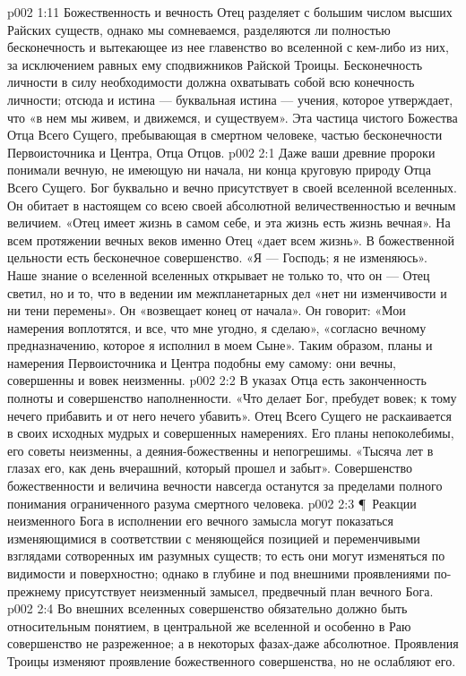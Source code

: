 \vs p002 1:11 Божественность и вечность Отец разделяет с большим числом высших Райских существ, однако мы сомневаемся, разделяются ли полностью бесконечность и вытекающее из нее главенство во вселенной с кем\hyp{}либо из них, за исключением равных ему сподвижников Райской Троицы. Бесконечность личности в силу необходимости должна охватывать собой всю конечность личности; отсюда и истина --- буквальная истина --- учения, которое утверждает, что «в нем мы живем, и движемся, и существуем». Эта частица чистого Божества Отца Всего Сущего, пребывающая в смертном человеке,  частью бесконечности Первоисточника и Центра, Отца Отцов.
\vs p002 2:1 Даже ваши древние пророки понимали вечную, не имеющую ни начала, ни конца круговую природу Отца Всего Сущего. Бог буквально и вечно присутствует в своей вселенной вселенных. Он обитает в настоящем со всею своей абсолютной величественностью и вечным величием. «Отец имеет жизнь в самом себе, и эта жизнь есть жизнь вечная». На всем протяжении вечных веков именно Отец «дает всем жизнь». В божественной цельности есть бесконечное совершенство. «Я --- Господь; я не изменяюсь». Наше знание о вселенной вселенных открывает не только то, что он --- Отец светил, но и то, что в ведении им межпланетарных дел «нет ни изменчивости и ни тени перемены». Он «возвещает конец от начала». Он говорит: «Мои намерения воплотятся, и все, что мне угодно, я сделаю», «согласно вечному предназначению, которое я исполнил в моем Сыне». Таким образом, планы и намерения Первоисточника и Центра подобны ему самому: они вечны, совершенны и вовек неизменны.
\vs p002 2:2 В указах Отца есть законченность полноты и совершенство наполненности. «Что делает Бог, пребудет вовек; к тому нечего прибавить и от него нечего убавить». Отец Всего Сущего не раскаивается в своих исходных мудрых и совершенных намерениях. Его планы непоколебимы, его советы неизменны, а деяния\hyp{}божественны и непогрешимы. «Тысяча лет в глазах его, как день вчерашний, который прошел и забыт». Совершенство божественности и величина вечности навсегда останутся за пределами полного понимания ограниченного разума смертного человека.
\vs p002 2:3 \P\ Реакции неизменного Бога в исполнении его вечного замысла могут показаться изменяющимися в соответствии с меняющейся позицией и переменчивыми взглядами сотворенных им разумных существ; то есть они могут изменяться по видимости и поверхностно; однако в глубине и под внешними проявлениями по\hyp{}прежнему присутствует неизменный замысел, предвечный план вечного Бога.
\vs p002 2:4 Во внешних вселенных совершенство обязательно должно быть относительным понятием, в центральной же вселенной и особенно в Раю совершенство не разреженное; а в некоторых фазах\hyp{}даже абсолютное. Проявления Троицы изменяют проявление божественного совершенства, но не ослабляют его.
